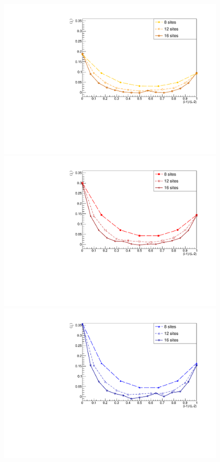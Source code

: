 \begin{figure}[H]
\centering
    \includegraphics[scale=0.55]{Figures/spinCurrVSsize_Gamma05.pdf}
    \label{fig:8sites_LMvsGamma}
    \includegraphics[scale=0.55]{Figures/spinCurrVSsize_Gamma1.pdf}
    \label{fig:12sites_LMvsGamma}
    \includegraphics[scale=0.55]{Figures/spinCurrVSsize_Gamma15.pdf}

\end{figure}
